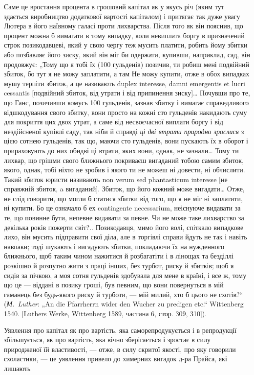
Саме це вростання процента в грошовий капітал як у якусь
річ (яким тут здається виробництво додаткової вартості капіталом)
і притягає так дуже увагу Лютера в його наївному
галасі проти лихварства. Після того як він пояснив, що
процент можна б вимагати в тому випадку, коли невиплата
боргу в призначений строк позикодавцеві, який у свою чергу
теж мусить платити, робить йому збитки або позбавляє його
зиску, який він міг би одержати, купивши, наприклад, сад,
він продовжує: „Тому що я тобі їх (100 гульденів) позичив, ти
робиш мені подвійний збиток, бо тут я не можу заплатити,
а там Не можу купити, отже в обох випадках мушу терпіти
збиток, а це називають duplex interesse, damni emergentis et
lucri cessantis [подвійний збиток, від утрати і від припинення
зиску]\dots{} Почувши про те, що Ганс, позичивши комусь
100 гульденів, зазнав збитку і вимагає справедливого відшкодування
свого збитку, вони просто на кожні сто гульденів накидають
суму для покриття цих двох утрат, а саме від несвоєчасної
виплати боргу і від нездійсненої купівлі саду, так ніби
й справді \emph{ці дві втрати природно зрослися} з цією сотнею гульденів,
так що, маючи сто гульденів, вони пускають їх в оборот
і прираховують до них обидві ці втрати, яких вони, однак, не
зазнали\dots{} Тому ти лихвар, що грішми свого ближнього покриваєш
вигаданий тобою самим збиток, якого, однак, тобі ніхто
не зробив і якого ти не можеш ні довести, ні обчислити. Такий
збиток юристи називають non verum sed phantasticum interesse [не
справжній збиток, a вигаданий]. Збиток, що його кожний може вигадати\dots{}
Отже, не слід говорити, що могли б статися збитки від
того, що я не міг ні заплатити, ні купити. Бо це означало б ех
contingente necessarium, неіснуюче видавати за те, що повинне
бути, непевне видавати за певне. Чи не може таке лихварство за
декілька років пожерти світ?.. Позикодавця, мимо його волі, спіткало
випадкове лихо, він мусить підправити свої діла, але в торгівлі
справи йдуть не так і навіть навпаки; тоді шукають і вигадують
збитки, покладаючи їх на нужденного ближнього, щоб таким
чином нажитися й розбагатіти і в лінощах та безділлі розкішно
й розпутно жити з праці інших, без турбот, риску й збитків;
щоб я сидів за пічкою, а моя сотня гульденів здобувала для
мене в країні, і все ж, тому що це — віддані в позику гроші, був
певним, що вони повернуться в мій гаманець без будь-якого
риску й турботи, — мій милий, хто б цього не схотів?“ (\emph{М.~Luther}:
„An die Pfarrherrn wider den Wucher zu predigen etc.“ Wittenberg
1540. [Luthers Werke, Wittenberg 1589, частина 6, стор. 309,
310]).

Уявлення про капітал як про вартість, яка саморепродукується
і в репродукції збільшується, як про вартість, яка вічно
зберігається і зростає в силу природженої їй властивості, —
отже, в силу скритої якості, про яку говорили схоластики, — це
уявлення привело до химерних вигадок д-ра Прайса, які лишають
\parbreak{}  %
